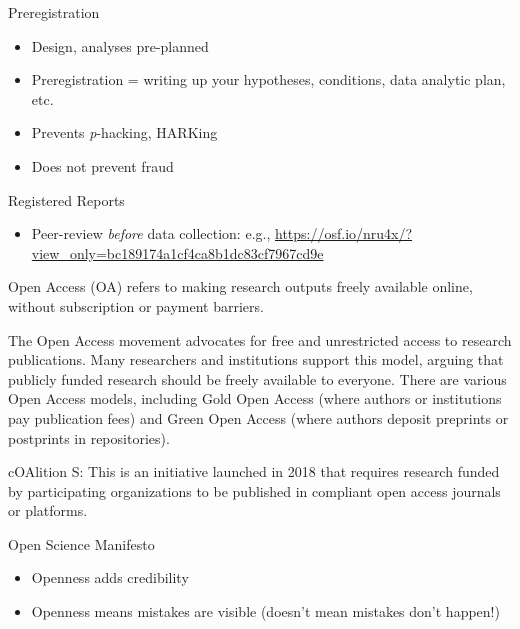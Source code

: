 \documentclass[
  ignorenonframetext,
  aspectratio=169,
]{beamer}
\providecommand{\tightlist}{%
  \setlength{\itemsep}{0pt}\setlength{\parskip}{0pt}}\usepackage{longtable,booktabs,array}
\begin{document}
\begin{frame}{Preregistration}
\label{preregistration}
\begin{itemize}
\tightlist
\item
  Design, analyses pre-planned
\item
  Preregistration = writing up your hypotheses, conditions, data
  analytic plan, etc.
\item
  Prevents \emph{p}-hacking, HARKing
\item
  Does not prevent fraud
\end{itemize}
\end{frame}

\begin{frame}{Registered Reports}
\label{registered-reports}
\begin{itemize}
\tightlist
\item
  Peer-review \emph{before} data collection: e.g.,
  \url{https://osf.io/nru4x/?view_only=bc189174a1cf4ca8b1dc83cf7967cd9e}
\end{itemize}
\end{frame}

\begin{frame}{}
\label{section-1}
Open Access (OA) refers to making research outputs freely available
online, without subscription or payment barriers.

The Open Access movement advocates for free and unrestricted access to
research publications. Many researchers and institutions support this
model, arguing that publicly funded research should be freely available
to everyone. There are various Open Access models, including Gold Open
Access (where authors or institutions pay publication fees) and Green
Open Access (where authors deposit preprints or postprints in
repositories).

cOAlition S: This is an initiative launched in 2018 that requires
research funded by participating organizations to be published in
compliant open access journals or platforms.
\end{frame}

\begin{frame}{Open Science Manifesto}
\label{open-science-manifesto}
\begin{itemize}
\tightlist
\item
  Openness adds credibility
\item
  Openness means mistakes are visible (doesn't mean mistakes don't
  happen!)
\end{itemize}
\end{frame}
\end{document}

